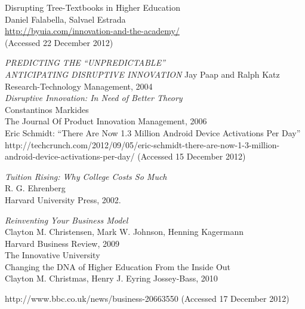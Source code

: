 \documentclass[a4paper,10pt]{article}
\begin{document}
\begin{thebibliography}{9}
  Disrupting Tree-Textbooks in Higher Education\\
  Daniel Falabella, Salvael Estrada\\
  \url{http://byuia.com/innovation-and-the-academy/}\\
   (Accessed 22 December 2012)

  \emph{PREDICTING THE “UNPREDICTABLE”\\
  ANTICIPATING DISRUPTIVE INNOVATION}
  Jay Paap and Ralph Katz\\
  Research-Technology Management, 2004\\ 

  \emph{Disruptive Innovation: In Need of Better Theory}\\
  Constantinos Markides\\
  The Journal Of Product Innovation Management, 2006\\


  Eric Schmidt: “There Are Now 1.3 Million Android Device Activations Per Day”
   http://techcrunch.com/2012/09/05/eric-schmidt-there-are-now-1-3-million-android-device-activations-per-day/
   (Accessed 15 December 2012)

 \emph{Tuition Rising: Why College Costs So Much} \\ 
 R. G. Ehrenberg\\
 Harvard University Press, 2002.
 
  \emph{Reinventing Your Business Model} \\
  Clayton M. Christensen, Mark W. Johnson, Henning Kagermann\\
  Harvard Business Review, 2009\\
 
 The Innovative University \\
 Changing the DNA of Higher Education From the Inside Out \\
 Clayton M. Christmas, Henry J. Eyring
 Jossey-Bass, 2010
 
 http://www.bbc.co.uk/news/business-20663550
 (Accessed 17 December 2012)


\end{thebibliography}
\end{document}

